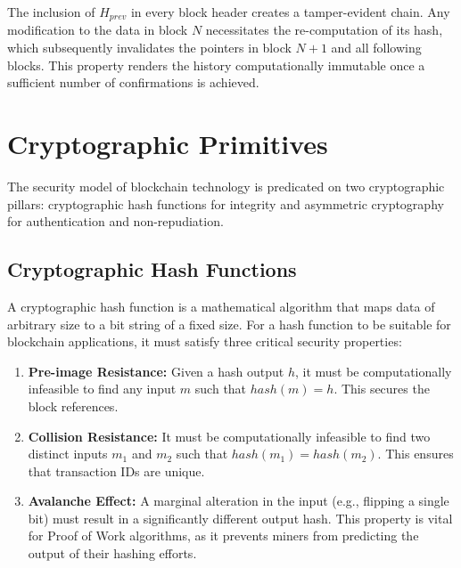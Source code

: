 The inclusion of $H_{prev}$ in every block header creates a tamper-evident chain. Any modification to the data in block $N$ necessitates the re-computation of its hash, which subsequently invalidates the pointers in block $N+1$ and all following blocks. This property renders the history computationally immutable once a sufficient number of confirmations is achieved.

\section{Cryptographic Primitives} \label{ch2_crypto}

The security model of blockchain technology is predicated on two cryptographic pillars: cryptographic hash functions for integrity and asymmetric cryptography for authentication and non-repudiation.

\subsection{Cryptographic Hash Functions}
A cryptographic hash function is a mathematical algorithm that maps data of arbitrary size to a bit string of a fixed size.
For a hash function to be suitable for blockchain applications, it must satisfy three critical security properties:
\begin{enumerate}
    \item \textbf{Pre-image Resistance:} Given a hash output $h$, it must be computationally infeasible to find any input $m$ such that $hash(m) = h$. This secures the block references.
    \item \textbf{Collision Resistance:} It must be computationally infeasible to find two distinct inputs $m_1$ and $m_2$ such that $hash(m_1) = hash(m_2)$. This ensures that transaction IDs are unique.
    \item \textbf{Avalanche Effect:} A marginal alteration in the input (e.g., flipping a single bit) must result in a significantly different output hash. This property is vital for Proof of Work algorithms, as it prevents miners from predicting the output of their hashing efforts.
\end{enumerate}
